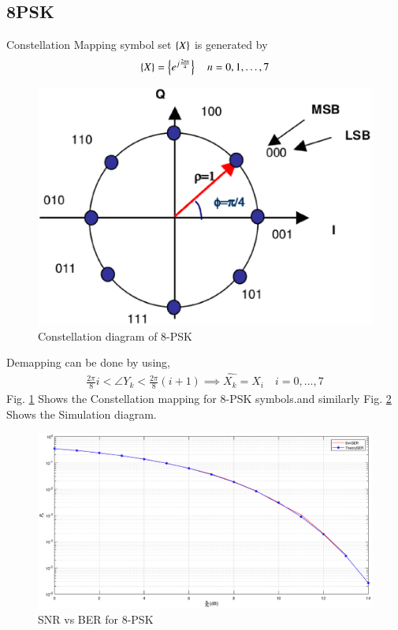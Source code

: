 \documentclass[journal,12pt,twocolumn]{IEEEtran}
\begin{document}
\subsection{8PSK}
Constellation Mapping symbol set $\left\{X\right\}$ is generated by
\begin{equation}
\left\{X\right\}= \left\{e^{j \frac{2\pi n}{4}}\right\} \quad n=0,1,\dots,7
\end{equation}
\begin{figure}[!ht]
\begin{center}
\includegraphics[width=\columnwidth]{./figs/8psk}
\end{center}
\caption{Constellation diagram of 8-PSK}
\label{fig:8psk}
\end{figure}
Demapping can be done by using,
\begin{align}
\frac{2\pi }{8}i < \angle{Y_k} < \frac{2\pi }{8}(i+1) \implies \hat{X_k}=X_i \quad i=0,\dots,7
\end{align}
Fig. \ref{fig:8psk} Shows the Constellation mapping for 8-PSK symbols.and similarly Fig. \ref{fig:8psk1} Shows the Simulation diagram.
%
\begin{figure}[!ht]
\begin{center}
\includegraphics[width=\columnwidth]{./figs/8PSK}
\end{center}
\caption{SNR vs BER for 8-PSK}
\label{fig:8psk1}
\end{figure}
%
\end{document}

